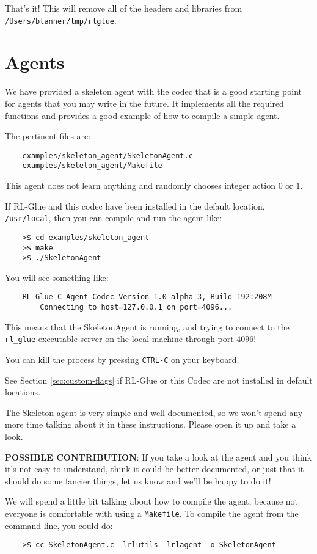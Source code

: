 \documentclass[11pt]{article}
\begin{document}
That's it!  This will remove all of the headers and libraries from \texttt{/Users/btanner/tmp/rlglue}.


\section{Agents}
\label{sec:agent}
We have provided a skeleton agent with the codec that is a good starting point for agents that you may write in the future.
It implements all the required functions and provides a good example of how to compile a simple agent.

The pertinent files are:
\begin{verbatim}
	examples/skeleton_agent/SkeletonAgent.c
	examples/skeleton_agent/Makefile
\end{verbatim}

This agent does not learn anything and randomly chooses integer action $0$ or $1$.  

If RL-Glue and this codec have been installed in the default location, \texttt{/usr/local}, then you can compile and run the agent like:
\begin{verbatim}
	>$ cd examples/skeleton_agent
	>$ make
	>$ ./SkeletonAgent
\end{verbatim}

You will see something like:
\begin{verbatim}
	RL-Glue C Agent Codec Version 1.0-alpha-3, Build 192:208M
		Connecting to host=127.0.0.1 on port=4096...
\end{verbatim}

This means that the SkeletonAgent is running, and trying to connect to the \texttt{rl\_glue} executable server on the local machine through port $4096$! 

You can kill the process by pressing \texttt{CTRL-C} on your keyboard.

See Section \ref{sec:custom-flags} if RL-Glue or this Codec are not installed in default locations.

The Skeleton agent is very simple and well documented, so we won't spend any more time talking about it in these instructions.
Please open it up and take a look.

\textbf{POSSIBLE CONTRIBUTION}: If you take a look at the agent and you think it's not easy to understand, think it could be better documented, 
or just that it should do some fancier things, let us know and we'll be happy to do it!

We will spend a little bit talking about how to compile the agent, because not everyone is comfortable with using a \texttt{Makefile}.  To compile
the agent from the command line, you could do:
\begin{verbatim}
	>$ cc SkeletonAgent.c -lrlutils -lrlagent -o SkeletonAgent
\end{verbatim}
\end{document}
